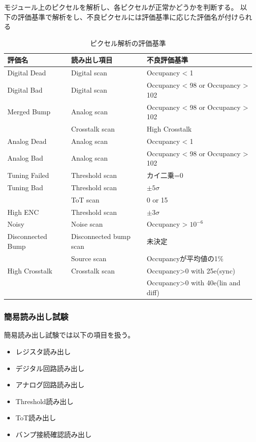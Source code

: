モジュール上のピクセルを解析し、各ピクセルが正常かどうかを判断する。
以下の評価基準で解析をし、不良ピクセルには評価基準に応じた評価名が付けられる

\begin{table}[tbp]
\begin{center}
\caption[ピクセル解析の評価基準]{ピクセル解析の評価基準\cite{3-1}}
\label{pixel_analysis_criteria}
  \begin{tabular}{|lll|} \hline
    評価名 & 読み出し項目 & 不良評価基準 \\ \hline
    Digital Dead      & Digital scan           & Occupancy < 1 \\ \hline
    Digital Bad       & Digital scan           & Occupancy < 98 or Occupancy > 102\\\hline 
    Merged Bump       & Analog scan            & Occupancy < 98 or Occupancy > 102 \\ 
                      & Crosstalk scan         & High Crosstalk\\ \hline
    Analog Dead       & Analog scan            & Occupancy < 1 \\ \hline
    Analog Bad        & Analog scan            & Occupancy < 98 or Occupancy > 102 \\ \hline
    Tuning Failed     & Threshold scan         & カイ二乗=0 \\ \hline
    Tuning Bad        & Threshold scan         & $\pm5\sigma$\\ 
                      & ToT scan               & 0 or 15 \\ \hline
    High ENC          & Threshold scan         & $\pm3\sigma$ \\ \hline
    Noisy             & Noise scan             & Occupancy > $10^{-6}$\\ \hline
    Disconnected Bump & Disconnected bump scan & 未決定 \\ 
                      & Source scan            & Occupancyが平均値の1$\%$ \\ \hline
    High Crosstalk    & Crosstalk scan         & Occupancy>0 with 25e(sync)\\
                      &                        & Occupancy>0 with 40e(lin and diff)\\ \hline 
  \end{tabular}
\end{center}
\end{table}

\subsubsection{簡易読み出し試験}
簡易読み出し試験では以下の項目を扱う。
\begin{itemize}
  \item レジスタ読み出し
  \item デジタル回路読み出し
  \item アナログ回路読み出し
  \item Threshold読み出し
  \item ToT読み出し
  \item バンプ接続確認読み出し
\end{itemize}

